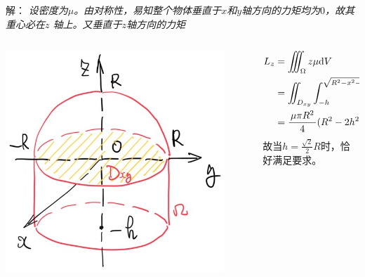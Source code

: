 \begin{frame}
	\linespread{1.5}

	\small 解：\it
	设密度为$\mu$。由对称性，易知整个物体垂直于$x$和$y$轴方向的力矩均为$0$，故其重心必在$z$
	轴上。又垂直于$z$轴方向的力矩
	\begin{columns}
		\begin{column}{.45\textwidth}
			\begin{center}
				\includegraphics[width=0.9\textwidth]{./images/ch10/10.4.2.jpg}
			\end{center}
		\end{column}
		\begin{column}{.55\textwidth}
			\begin{align*}
				L_z
				&=\iiint_{\Omega}z\mu\mathrm{d} V\\
				&=\iint_{D_{xy}}\int_{-h}^{\sqrt{R^2-x^2-y^2}}z\mu\mathrm{d} z\mathrm{d}\sigma_{xy}\\
				&=\displaystyle\frac{\,{\mu\pi R^2}\,}{\,{4}\,}(R^2-2h^2),
			\end{align*}
			故当$h=\frac{\sqrt2}2R$时，恰好满足要求。\fin
		\end{column}
	\end{columns}
\end{frame}

